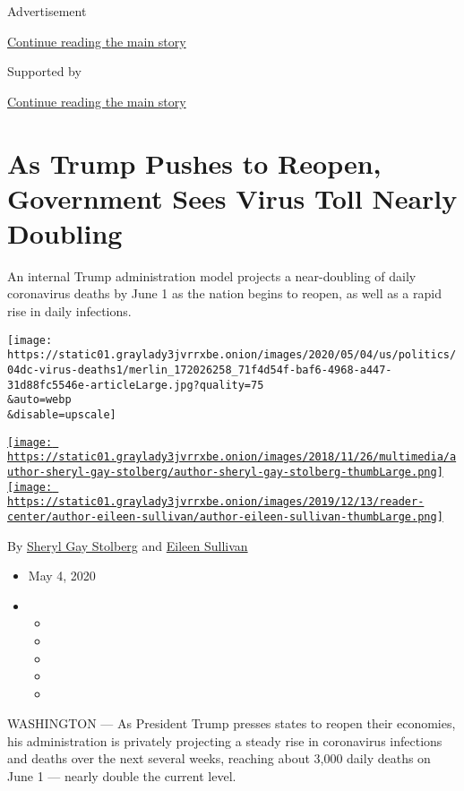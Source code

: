 Advertisement

\protect\hyperlink{after-top}{Continue reading the main story}

Supported by

\protect\hyperlink{after-sponsor}{Continue reading the main story}

\hypertarget{as-trump-pushes-to-reopen-government-sees-virus-toll-nearly-doubling}{%
\section{As Trump Pushes to Reopen, Government Sees Virus Toll Nearly
Doubling}\label{as-trump-pushes-to-reopen-government-sees-virus-toll-nearly-doubling}}

An internal Trump administration model projects a near-doubling of daily
coronavirus deaths by June 1 as the nation begins to reopen, as well as
a rapid rise in daily infections.

\texttt{[image: https://static01.graylady3jvrrxbe.onion/images/2020/05/04/us/politics/04dc-virus-deaths1/merlin\_172026258\_71f4d54f-baf6-4968-a447-31d88fc5546e-articleLarge.jpg?quality=75\\\&auto=webp\\\&disable=upscale]}

\href{https://www.nytimes3xbfgragh.onion/by/sheryl-gay-stolberg}{\texttt{[image: https://static01.graylady3jvrrxbe.onion/images/2018/11/26/multimedia/author-sheryl-gay-stolberg/author-sheryl-gay-stolberg-thumbLarge.png]}}\href{https://www.nytimes3xbfgragh.onion/by/eileen-sullivan}{\texttt{[image: https://static01.graylady3jvrrxbe.onion/images/2019/12/13/reader-center/author-eileen-sullivan/author-eileen-sullivan-thumbLarge.png]}}

By
\href{https://www.nytimes3xbfgragh.onion/by/sheryl-gay-stolberg}{Sheryl
Gay Stolberg} and
\href{https://www.nytimes3xbfgragh.onion/by/eileen-sullivan}{Eileen
Sullivan}

\begin{itemize}
\item
  May 4, 2020
\item
  \begin{itemize}
  \item
  \item
  \item
  \item
  \item
  \end{itemize}
\end{itemize}

WASHINGTON --- As President Trump presses states to reopen their
economies, his administration is privately projecting a steady rise in
coronavirus infections and deaths over the next several weeks, reaching
about 3,000 daily deaths on June 1 --- nearly double the current level.


